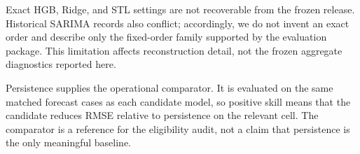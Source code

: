 Exact HGB, Ridge, and STL settings are not recoverable from the frozen
release. Historical SARIMA records also conflict; accordingly, we do not
invent an exact order and describe only the fixed-order family supported by
the evaluation package. This limitation affects reconstruction detail,
not the frozen aggregate diagnostics reported here.

Persistence supplies the operational comparator. It is evaluated on the
same matched forecast cases as each candidate model, so positive skill means
that the candidate reduces RMSE relative to persistence on the relevant
cell. The comparator is a reference for the eligibility audit, not a claim
that persistence is the only meaningful baseline.



